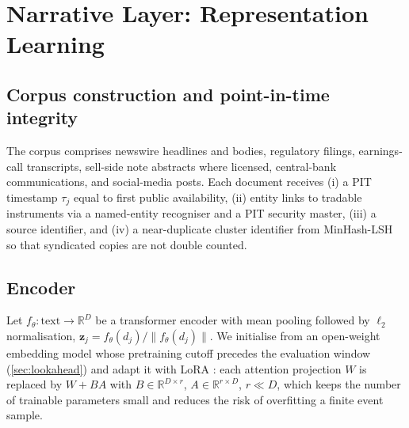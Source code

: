\documentclass[11pt,a4paper]{article}
\theoremstyle{plain}
\theoremstyle{definition}
\theoremstyle{remark}
\newcommand{\R}{\mathbb{R}}
\newcommand{\z}{\bm{z}}
\begin{document}
\section{Narrative Layer: Representation Learning}\label{sec:narrative}

\subsection{Corpus construction and point-in-time integrity}
The corpus comprises newswire headlines and bodies, regulatory filings, earnings-call transcripts, sell-side note abstracts where licensed, central-bank communications, and social-media posts. Each document receives (i) a PIT timestamp $\tau_j$ equal to first public availability, (ii) entity links to tradable instruments via a named-entity recogniser and a PIT security master, (iii) a source identifier, and (iv) a near-duplicate cluster identifier from MinHash-LSH so that syndicated copies are not double counted.

\subsection{Encoder}
Let $f_\theta:\text{text}\to\R^D$ be a transformer encoder with mean pooling followed by $\ell_2$ normalisation, $\z_j=f_\theta(d_j)/\|f_\theta(d_j)\|$. We initialise from an open-weight embedding model whose pretraining cutoff precedes the evaluation window (\cref{sec:lookahead}) and adapt it with LoRA \citep{hu2022}: each attention projection $W$ is replaced by $W+BA$ with $B\in\R^{D\times r}$, $A\in\R^{r\times D}$, $r\ll D$, which keeps the number of trainable parameters small and reduces the risk of overfitting a finite event sample.
\end{document}
